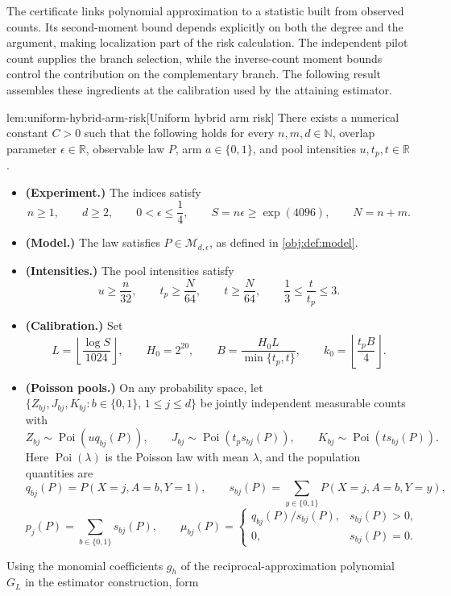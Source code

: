 The certificate links polynomial approximation to a statistic built from observed counts. Its second-moment bound depends explicitly on both the degree and the argument, making localization part of the risk calculation. The independent pilot count supplies the branch selection, while the inverse-count moment bounds control the contribution on the complementary branch. The following result assembles these ingredients at the calibration used by the attaining estimator.

\begin{lemmav}{lem:uniform-hybrid-arm-risk}[Uniform hybrid arm risk]
There exists a numerical constant \(C>0\) such that the following holds for every \(n,m,d\in\mathbb N\), overlap parameter \(\epsilon\in\mathbb R\), observable law \(P\), arm \(a\in\{0,1\}\), and pool intensities \(u,t_p,t\in\mathbb R\).
\begin{itemize}
\item \textbf{(Experiment.)} The indices satisfy
\[
n\ge1,\qquad d\ge2,\qquad 0<\epsilon\le\frac14,\qquad
S=n\epsilon\ge\exp(4096),\qquad N=n+m.
\]
\item \textbf{(Model.)} The law satisfies \(P\in\mathcal M_{d,\epsilon}\), as defined in \cref{obj:def:model}.
\item \textbf{(Intensities.)} The pool intensities satisfy
\[
u\ge\frac n{32},\qquad t_p\ge\frac N{64},\qquad
t\ge\frac N{64},\qquad \frac13\le\frac t{t_p}\le3.
\]
\item \textbf{(Calibration.)} Set
\[
L=\left\lfloor\frac{\log S}{1024}\right\rfloor,\qquad
H_0=2^{20},\qquad B=\frac{H_0L}{\min\{t_p,t\}},\qquad
k_0=\left\lfloor\frac{t_pB}{4}\right\rfloor.
\]
\item \textbf{(Poisson pools.)} On any probability space, let
\(\{Z_{bj},J_{bj},K_{bj}:b\in\{0,1\},\,1\le j\le d\}\)
be jointly independent measurable counts with
\[
Z_{bj}\sim\operatorname{Poi}\!\left(uq_{bj}(P)\right),\qquad
J_{bj}\sim\operatorname{Poi}\!\left(t_ps_{bj}(P)\right),\qquad
K_{bj}\sim\operatorname{Poi}\!\left(ts_{bj}(P)\right).
\]
Here \(\operatorname{Poi}(\lambda)\) is the Poisson law with mean \(\lambda\), and the population quantities are
\[
q_{bj}(P)=P(X=j,A=b,Y=1),\qquad
s_{bj}(P)=\sum_{y\in\{0,1\}}P(X=j,A=b,Y=y),
\]
\[
p_j(P)=\sum_{b\in\{0,1\}}s_{bj}(P),\qquad
\mu_{bj}(P)=
\begin{cases}
q_{bj}(P)/s_{bj}(P),&s_{bj}(P)>0,\\
0,&s_{bj}(P)=0.
\end{cases}
\]
\end{itemize}
Using the monomial coefficients \(g_h\) of the reciprocal-approximation polynomial \(G_L\) in the estimator construction, form

\end{lemmav}
